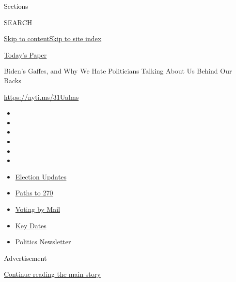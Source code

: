 Sections

SEARCH

\protect\hyperlink{site-content}{Skip to
content}\protect\hyperlink{site-index}{Skip to site index}

\href{https://myaccount.nytimes3xbfgragh.onion/auth/login?response_type=cookie\&client_id=vi}{}

\href{https://www.nytimes3xbfgragh.onion/section/todayspaper}{Today's
Paper}

Biden's Gaffes, and Why We Hate Politicians Talking About Us Behind Our
Backs

\url{https://nyti.ms/31Ualms}

\begin{itemize}
\item
\item
\item
\item
\item
\item
\end{itemize}

\begin{itemize}
\item
  \href{https://www.nytimes3xbfgragh.onion/live/2020/09/08/us/trump-vs-biden?action=click\&pgtype=Article\&state=default\&region=TOP_BANNER\&context=storylines_menu}{Election
  Updates}
\item
  \href{https://www.nytimes3xbfgragh.onion/interactive/2020/us/elections/election-states-biden-trump.html?action=click\&pgtype=Article\&state=default\&region=TOP_BANNER\&context=storylines_menu}{Paths
  to 270}
\item
  \href{https://www.nytimes3xbfgragh.onion/interactive/2020/08/31/us/politics/vote-by-mail-deadlines.html?action=click\&pgtype=Article\&state=default\&region=TOP_BANNER\&context=storylines_menu}{Voting
  by Mail}
\item
  \href{https://www.nytimes3xbfgragh.onion/interactive/2019/us/elections/2020-presidential-election-calendar.html?action=click\&pgtype=Article\&state=default\&region=TOP_BANNER\&context=storylines_menu}{Key
  Dates}
\item
  \href{https://www.nytimes3xbfgragh.onion/newsletters/politics?action=click\&pgtype=Article\&state=default\&region=TOP_BANNER\&context=storylines_menu}{Politics
  Newsletter}
\end{itemize}

Advertisement

\protect\hyperlink{after-top}{Continue reading the main story}

